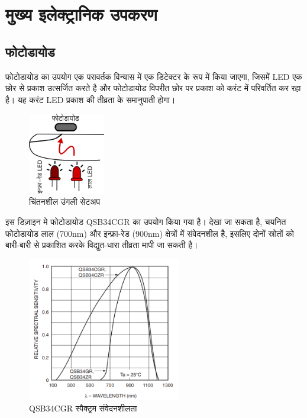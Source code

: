 \section{मुख्य इलेक्ट्रानिक उपकरण}
	


	\subsection{फोटोडायोड}
	
		फोटोडायोड का उपयोग एक परावर्तक विन्यास में एक डिटेक्टर के रूप में किया जाएगा, जिसमें LED एक छोर से प्रकाश उत्सर्जित करते है और फोटोडायोड विपरीत छोर पर प्रकाश को करंट में परिवर्तित कर रहा है। यह करंट LED प्रकाश की तीव्रता के समानुपाती होगा।
		
		\begin{figure}[ht!]
			\centering
			\includegraphics[width=0.3\textwidth]{images/finger_setup_hi.png}
			\caption{चिंतनशील उंगली सेटअप}
		\end{figure}

			इस डिज़ाइन मे फोटोडायोड QSB34CGR का उपयोग किया गया है। देखा जा सकता है, चयनित फोटोडायोड लाल (700nm) और इन्फ्रा-रेड (900nm) क्षेत्रों में संवेदनशील है, इसलिए दोनों स्रोतों को बारी-बारी से प्रकाशित करके विद्युत-धारा तीव्रता मापी जा सकती है।
		\begin{figure}[ht!]
			\centering
			\includegraphics[width=0.6\textwidth]{../common/QSBCGR.png}
			\caption{QSB34CGR स्पैक्ट्रम संवेदनशीलता}
		\end{figure}
	
